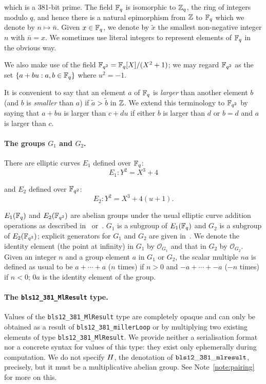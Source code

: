 \noindent which is a 381-bit prime. The field $\mathbb{F}_q$ is isomorphic to $\mathbb{Z}_q$,
the ring of integers modulo $q$, and hence there is a natural epimorphism from
$\mathbb{Z}$ to $\mathbb{F}_q$ which we denote by $n \mapsto \bar{n}$.  Given $x \in \mathbb{F}_q$, we
denote by $\tilde{x}$ the smallest non-negative integer $n$ with $\bar{n} = x$.
We sometimes use literal integers to represent elements of $\mathbb{F}_q$ in the obvious
way.

We also make use of the field $\mathbb{F}_{q^2} = \mathbb{F}_q[X]/(X^2+1)$; we may regard $\mathbb{F}_{q^2}$ as
the set $\{a+bu: a,b \in \mathbb{F}_q\}$ where $u^2=-1$.

It is convenient to say that an element $a$ of $\mathbb{F}_q$ is \textit{larger} than
another element $b$ (and $b$ is \textit{smaller} than $a$) if $\tilde{a}
> \tilde{b}$ in $\mathbb{Z}$.  We extend this terminology to $\mathbb{F}_{q^2}$ by saying that
$a+bu$ is larger than $c+du$ if either $b$ is larger than $d$ or $b=d$ and $a$
is larger than $c$.


\paragraph{The groups $G_1$ and $G_2$.}
\noindent There are elliptic curves $E_1$ defined over $\mathbb{F}_q$:
$$
E_1: Y^2 = X^3 + 4
$$

\noindent and $E_2$ defined over $\mathbb{F}_{q^2}$:
$$
E_2: Y^2 = X^3 + 4(u+1).
$$

\noindent $E_1(\mathbb{F}_q)$ and  $E_2(\mathbb{F}_{q^2})$  are abelian groups under the
usual elliptic curve addition operations as described
in~\cite[III.2]{Silverman-Arithmetic-EC} or~\cite[2.1]{Costello-pairings}.
$G_1$ is a subgroup of $E_1(\mathbb{F}_q)$ and $G_2$ is a subgroup of $E_2(\mathbb{F}_{q^2})$;
explicit generators for $G_1$ and $G_2$ are given
in~\cite[4.2.1]{IETF-pairing-friendly-curves}.  We denote the identity element
(the point at infinity) in $G_1$ by $\mathcal{O}_{G_1}$ and that in $G_2$ by
$\mathcal{O}_{G_2}$.  Given an integer $n$ and a group element $a$ in $G_1$ or
$G_2$, the scalar multiple $na$ is defined as usual to be $a + \cdots + a$ ($n$
times) if $n>0$ and $-a + \cdots + -a$ ($-n$ times) if $n<0$; $0a$ is the
identity element of the group.

\paragraph{The \texttt{bls12\_381\_MlResult} type.}
\noindent Values of the \texttt{bls12\_381\_MlResult} type are completely
opaque and can only be obtained as a result of \texttt{bls12\_381\_millerLoop}
or by multiplying two existing elements of type \texttt{bls12\_381\_MlResult}.
We provide neither a serialisation format nor a concrete syntax for values of
this type: they exist only ephemerally during computation.  We do not specify
$H$, the denotation of $\mathtt{bls12\_381\_mlresult}$, precisely, but it
must be a multiplicative abelian group. See Note~\ref{note:pairing} for more on
this.

